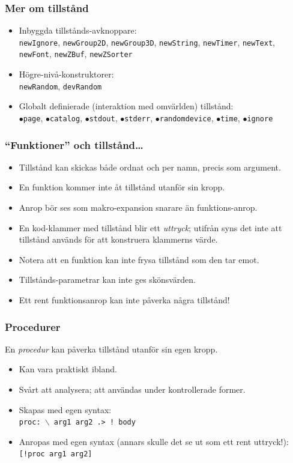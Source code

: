 \documentclass[noamsthm,handout]{beamer}
\begin{document}
\begin{frame}\frametitle{Mer om tillstånd}
  \begin{itemize}
  \item Inbyggda tillstånds-avknoppare:\\
    \texttt{newIgnore}, \texttt{newGroup2D}, \texttt{newGroup3D}, \texttt{newString}, \texttt{newTimer}, \texttt{newText}, \texttt{newFont}, \texttt{newZBuf}, \texttt{newZSorter}
  \item Högre-nivå-konstruktorer:\\
    \texttt{newRandom}, \texttt{devRandom}
  \item Globalt definierade (interaktion med omvärlden) tillstånd:\\
    \texttt{$\bullet$page}, \texttt{$\bullet$catalog}, \texttt{$\bullet$stdout}, \texttt{$\bullet$stderr}, \texttt{$\bullet$randomdevice}, \texttt{$\bullet$time}, \texttt{$\bullet$ignore}
  \end{itemize}
\end{frame}

\begin{frame}\frametitle{``Funktioner'' och tillstånd\ldots}
  \begin{itemize}
  \item Tillstånd kan skickas både ordnat och per namn, precis som argument.
  \item En funktion kommer inte åt tillstånd utanför sin kropp.
  \item Anrop bör ses som makro-expansion snarare än funktions-anrop.
  \item En kod-klammer med tillstånd blir ett \emph{uttryck}; utifrån syns det inte att tillstånd används för att konstruera klammerns värde.
  \item Notera att en funktion kan inte frysa tillstånd som den tar emot.
  \item Tillstånds-parametrar kan inte ges skönsvärden.
  \item Ett rent funktionsanrop kan inte påverka några tillstånd!
  \end{itemize}
\end{frame}

\begin{frame}\frametitle{Procedurer}
  En \emph{procedur} kan påverka tillstånd utanför sin egen kropp.

  \begin{itemize}
  \item Kan vara praktiskt ibland.
  \item Svårt att analysera; att användas under kontrollerade former.
  \item Skapas med egen syntax:\\
    \texttt{proc: {\color{red}$\backslash$} arg1 arg2 {\color{red}.> !} body}
  \item Anropas med egen syntax (annars skulle det se ut som ett rent uttryck!):\\
    \texttt{{\color{red}[!}proc arg1 arg2{\color{red}]}}
  \end{itemize}
\end{frame}
\end{document}
